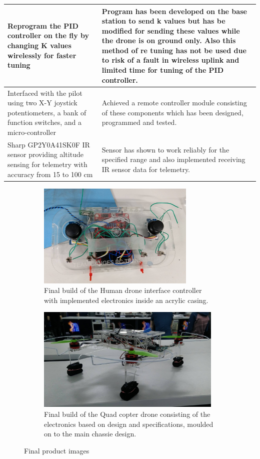 \documentclass{article}
\begin{document}
\begin{center}
\begin{tabular}{|m{5cm}|m{8cm}|}
    \hline
    Reprogram the PID controller on the fly by changing K values wirelessly for faster tuning & Program has been developed on the base station to send k values but has be modified for sending these values while the drone is on ground only. Also this method of re tuning has not be used due to risk of a fault in wireless uplink and limited time for tuning of the PID controller.\\
    \hline
    Interfaced with the pilot using two X-Y joystick potentiometers, a bank of function switches, and a micro-controller & Achieved a remote controller module consisting of these components which has been designed, programmed and tested.\\
    \hline 
    Sharp GP2Y0A41SK0F IR sensor providing altitude sensing for telemetry with accuracy from 15 to 100 cm & Sensor has shown to work reliably for the specified range and also implemented receiving IR sensor data for telemetry.\\
    \hline
    \end{tabular}
\end{center}
\begin{figure}[t]
    \begin{subfigure}{0.5\textwidth}
    \includegraphics[width=0.9\linewidth, height=5cm]{remote.jpg} 
    \caption{Final build of the Human drone interface controller with implemented electronics inside an acrylic casing.}
    \label{fig:subim1}
    \end{subfigure}
    \begin{subfigure}{0.5\textwidth}
    \includegraphics[width=0.9\linewidth, height=5cm]{drone.jpg}
    \caption{Final build of the Quad copter drone consisting of the electronics based on design and specifications, moulded on to the main chassie design.}
    \label{fig:subim2}
    \end{subfigure}
    \caption{Final product images}
    \label{fig:my_label}
\end{figure}
\end{document}
